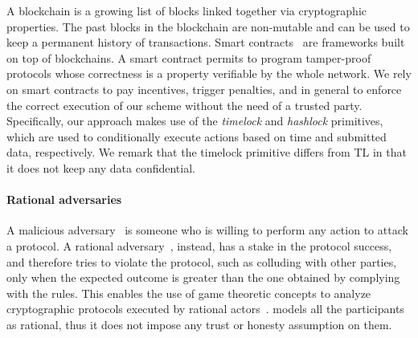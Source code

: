 A blockchain is a growing list of blocks linked together via cryptographic properties. The past blocks in the blockchain are non-mutable and can be used to keep a permanent history of transactions.
Smart contracts~\cite{szabo1997formalizing} are frameworks built on top of blockchains.
A smart contract permits to program tamper-proof protocols whose correctness is a property verifiable by the whole network.
%
%
We rely on smart contracts to pay incentives, trigger penalties, and in general to enforce the correct execution of our scheme without the need of a trusted party.
Specifically, our approach makes use of the {\em timelock} and {\em hashlock} primitives, which are used to conditionally execute actions based on time and submitted data, respectively.
We remark that the timelock primitive differs from TL in that it does not keep any data confidential.

\paragraph*{Rational adversaries}

A malicious adversary~\cite{Hazay10anote} is someone who is willing to perform any action to attack a protocol. A rational adversary~\cite{Groce2012}, instead, has a stake in the protocol success, and therefore tries to violate the protocol, such as colluding with other parties, only when the expected outcome is greater than the one obtained by complying with the rules. This enables the use of game theoretic concepts to analyze cryptographic protocols executed by rational actors~\cite{Asharov2016,raap,Provi07summaryreport}.
%
\shortname models all the participants as rational, thus it does not impose any trust or honesty assumption on them.